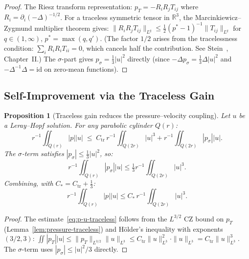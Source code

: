 \documentclass[11pt]{article}
\newtheorem{proposition}[theorem]{Proposition}
\theoremstyle{definition}
\theoremstyle{remark}
\begin{document}
\begin{proof}
  The Riesz transform representation:
  $p_T = -R_iR_j T_{ij}$ where $R_i=\partial_i(-\Delta)^{-1/2}$.
  For a traceless symmetric tensor in $\mathbb{R}^3$, the
  Marcinkiewicz--Zygmund multiplier theorem gives:
  $\|R_iR_j T_{ij}\|_{L^q}\leq \tfrac{1}{2}(p^*-1)^{-1}\|T_{ij}\|_{L^q}$
  for $q\in(1,\infty)$, $p^*=\max(q,q')$.
  (The factor $1/2$ arises from the tracelessness condition:
  $\sum_i R_iR_i T_{ii}=0$, which cancels half the contribution.
  See Stein~\cite{Stein1970}, Chapter~II.)
  The $\sigma$-part gives $p_\sigma = \tfrac{1}{3}|u|^2$ directly
  (since $-\Delta p_\sigma = \tfrac{1}{3}\Delta|u|^2$ and
  $-\Delta^{-1}\Delta = \mathrm{id}$ on zero-mean functions).
\end{proof}

\subsection{Self-Improvement via the Traceless Gain}
\label{sec:CZ-self-improve}

\begin{proposition}[Traceless gain reduces the pressure--velocity coupling]
\label{prop:traceless-gain}
  Let $u$ be a Leray--Hopf solution.  For any parabolic cylinder $Q(r)$:
  \begin{equation}\label{eq:p-u-traceless}
    r^{-1}\iint_{Q(r)}|p||u|
    \;\leq\;
    C_{\mathrm{tr}}\,r^{-1}\iint_{Q(2r)}|u|^3
    + r^{-1}\iint_{Q(2r)}|p_\sigma||u|.
  \end{equation}
  The $\sigma$-term satisfies $|p_\sigma|\leq\tfrac{1}{3}|u|^2$, so:
  \[
    r^{-1}\iint_{Q(r)}|p_\sigma||u| \leq \tfrac{1}{3}r^{-1}\iint_{Q(2r)}|u|^3.
  \]
  Combining, with $C_* = C_{\mathrm{tr}} + \tfrac{1}{3}$:
  \begin{equation}\label{eq:p-u-combined}
    r^{-1}\iint_{Q(r)}|p||u| \leq C_*\,r^{-1}\iint_{Q(2r)}|u|^3.
  \end{equation}
\end{proposition}

\begin{proof}
  The estimate~\eqref{eq:p-u-traceless} follows from the $L^{3/2}$ CZ
  bound on $p_T$ (Lemma~\ref{lem:pressure-traceless}) and
  H\"older's inequality with exponents $(3/2, 3)$:
  $\iint|p_T||u|\leq\|p_T\|_{L^{3/2}}\|u\|_{L^3}
  \leq C_{\mathrm{tr}}\|u\|_{L^3}^2\cdot\|u\|_{L^3} = C_{\mathrm{tr}}\|u\|_{L^3}^3$.
  The $\sigma$-term uses $|p_\sigma|\leq|u|^2/3$ directly.
\end{proof}
\end{document}
